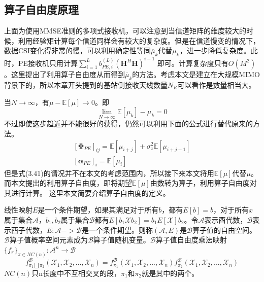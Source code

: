\documentclass[bachelor,nocolorlinks, printoneside]{seuthesis} %
\begin{document}
\begin{Main}
\section{算子自由度原理}
上面为使用MMSE准则的多项式接收机，可以注意到当信道矩阵的维度较大的时候，利用经验矩计算每个信道同样会有较大的复杂度。但是在信道慢变的情况下，数据CSI变化得非常的慢，可以利用确定性等同$\overline{\mu}_k$代替$\mu_k$，进一步降低复杂度。此时，PE接收机只用计算$\sum_{i=1}^{L} b_{PE,i}^{(L)}(\mathbf{H}^H\mathbf{H})^{i-1}$ 即可。计算复杂度只有$O(M^2)$。这里提出了利用算子自由度从而得到$\overline{\mu}_k$的方法。考虑本文是建立在大规模MIMO背景下的，所以本章开头提到的基站侧接收天线数量$N_R$可以看作是数量相当大。

当$N \rightarrow \infty$，有$\mu - \mathbb{E}[\mu] \rightarrow 0$。即
\begin{equation}\label{key}
\lim_{N \rightarrow \infty} \mathbb{E}[\mu_k] -\mu_k =0
\end{equation}
不过即使这步趋近并不能很好的获得，仍然可以利用下面的公式进行替代原来的方法。
\begin{gather}\label{key}
[\mathbf{\Phi}_{PE}]_{ij} = \mathbb{E}[\mu_{i+j}] + \sigma_{z}^2 \mathbb{E}[\mu_{i+j-1}] \nonumber \\
\left[\mathbf{\alpha}_{PE}\right]_i = \mathbb{E}[\mu_i]
\end{gather}
但是式(3.41)的请况并不在本文的考虑范围内，所以接下来本文将用$\mathbb{E}[\mu]$代替$\mu$。而本文提出的利用算子自由度，即将期望$\mathbb{E}[\mu]$由数转为算子，利用算子自由度对其进行计算。
这里本文简要介绍算子自由度的定义。

线性映射$E$是一个条件期望，如果其满足对于所有$b$，都有$E[b]=b$，对于所有$x$属于集合$\mathcal{A}$，$b_1,b_2$属于集合$\mathcal{B}$都有$E[b_1\mathcal{X}b_2]= b_1E[\mathcal{X}]b_2$。令$\mathcal{A}$表示酉代数，$\mathcal{B}$表示酉子代数，$E:\mathcal{A}->\mathcal{B}$是一个条件期望。则称$(\mathcal{A},E)$是$\mathcal{B}$算子值的自由空间。$\mathcal{B}$算子值概率空间元素成为$\mathcal{B}$算子值随机变量。$\mathcal{B}$算子值自由度乘法映射$\lbrace f_{\pi} \rbrace _{\pi \in NC(n)}:\mathcal{A}^n \rightarrow \mathcal{B}$
\begin{equation}\label{key}
f_{\pi_1 \bigsqcup \pi_2}^{\mathcal{B}}(\mathcal{X}_1,\mathcal{X}_2,...,\mathcal{X}_n) = f_{\pi_1}^{\mathcal{B}}(\mathcal{X}_1,\mathcal{X}_2,...,\mathcal{X}_n)f_{\pi_2}^{\mathcal{B}}(\mathcal{X}_1,\mathcal{X}_2,...,\mathcal{X}_n)
\end{equation}
$NC(n)$只n长度中不互相交叉的段，$\pi_1$和$\pi_2$就是其中的两个。


\end{Main}
\end{document}
